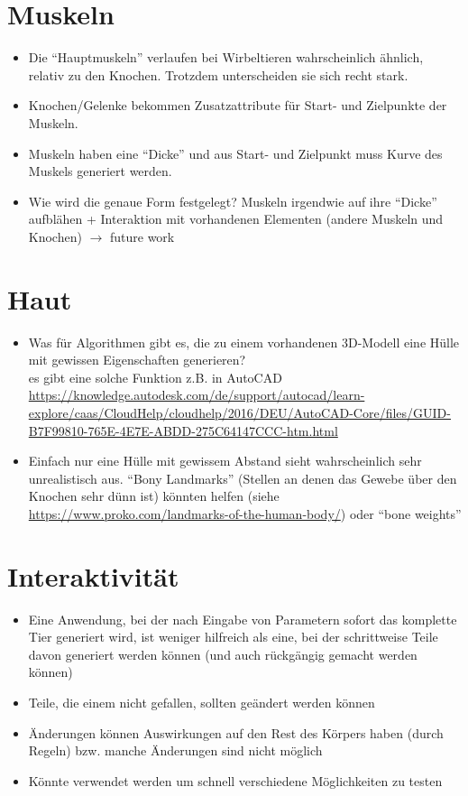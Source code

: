 \section{Muskeln}

\begin{itemize}
 \item Die "`Hauptmuskeln"' verlaufen bei Wirbeltieren wahrscheinlich ähnlich, relativ zu den Knochen. Trotzdem unterscheiden sie sich recht stark.
 \item Knochen/Gelenke bekommen Zusatzattribute für Start- und Zielpunkte der Muskeln.
 \item Muskeln haben eine "`Dicke"' und aus Start- und Zielpunkt muss Kurve des Muskels generiert werden.
 \item Wie wird die genaue Form festgelegt? Muskeln irgendwie auf ihre "`Dicke"' aufblähen + Interaktion mit vorhandenen Elementen (andere Muskeln und Knochen) $\rightarrow$ future work
\end{itemize}

\section{Haut}

\begin{itemize}
 \item Was für Algorithmen gibt es, die zu einem vorhandenen 3D-Modell eine Hülle mit gewissen Eigenschaften generieren? \\
 es gibt eine solche Funktion z.B. in AutoCAD \url{https://knowledge.autodesk.com/de/support/autocad/learn-explore/caas/CloudHelp/cloudhelp/2016/DEU/AutoCAD-Core/files/GUID-B7F99810-765E-4E7E-ABDD-275C64147CCC-htm.html}
 \item Einfach nur eine Hülle mit gewissem Abstand sieht wahrscheinlich sehr unrealistisch aus. "`Bony Landmarks"' (Stellen an denen das Gewebe über den Knochen sehr dünn ist) könnten helfen (siehe \url{https://www.proko.com/landmarks-of-the-human-body/}) oder "`bone weights"'
\end{itemize}

\section{Interaktivität}

\begin{itemize}
 \item Eine Anwendung, bei der nach Eingabe von Parametern sofort das komplette Tier generiert wird, ist weniger hilfreich als eine, bei der schrittweise Teile davon generiert werden können (und auch rückgängig gemacht werden können)
 \item Teile, die einem nicht gefallen, sollten geändert werden können
 \item Änderungen können Auswirkungen auf den Rest des Körpers haben (durch Regeln) bzw. manche Änderungen sind nicht möglich
 \item Könnte verwendet werden um schnell verschiedene Möglichkeiten zu testen
\end{itemize}


